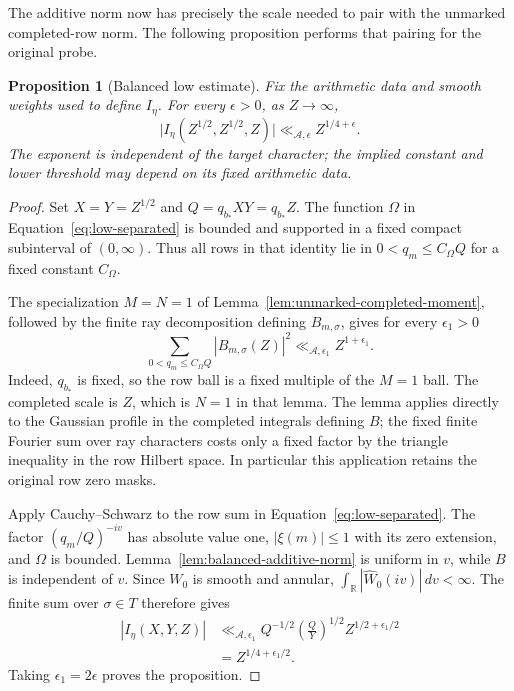 \documentclass[11pt,a4paper]{article}
\numberwithin{equation}{section}
\numberwithin{figure}{section}
\newtheorem{proposition}[theorem]{Proposition}
\theoremstyle{definition}
\theoremstyle{remark}
\begin{document}
The additive norm now has precisely the scale needed to pair with the
unmarked completed-row norm.  The following proposition performs that
pairing for the original probe.

\begin{proposition}[Balanced low estimate]
\label{prop:balanced-low}
Fix the arithmetic data and smooth weights used to define $I_\eta$.
For every $\epsilon>0$, as $Z\to\infty$,
\[
 \bigl|I_\eta(Z^{1/2},Z^{1/2},Z)\bigr|
 \ll_{\mathcal A,\epsilon} Z^{1/4+\epsilon}.
\]
The exponent is independent of the target character; the implied constant
and lower threshold may depend on its fixed arithmetic data.
\end{proposition}

\begin{proof}
Set $X=Y=Z^{1/2}$ and $Q=q_{b_*}XY=q_{b_*}Z$.  The function $\Omega$ in
Equation~\eqref{eq:low-separated} is bounded and supported in a fixed
compact subinterval of $(0,\infty)$.  Thus all rows in that identity lie
in $0<q_m\le C_\Omega Q$ for a fixed constant $C_\Omega$.

The specialization $M=N=1$ of
Lemma~\ref{lem:unmarked-completed-moment}, followed by the finite ray
decomposition defining $B_{m,\sigma}$, gives for every $\epsilon_1>0$
\[
 \sum_{0<q_m\le C_\Omega Q}|B_{m,\sigma}(Z)|^2
 \ll_{\mathcal A,\epsilon_1} Z^{1+\epsilon_1}.
\]
Indeed, $q_{b_*}$ is fixed, so the row ball is a fixed multiple of the
$M=1$ ball.  The completed scale is $Z$, which is $N=1$ in that lemma.
The lemma applies directly to the Gaussian profile in the
completed integrals defining $B$;
the fixed finite Fourier sum over ray characters costs only a fixed factor
by the triangle inequality in the row Hilbert space.  In particular this
application retains the original row zero masks.

Apply Cauchy--Schwarz to the row sum in
Equation~\eqref{eq:low-separated}.  The factor $(q_m/Q)^{-iv}$ has absolute
value one, $|\xi(m)|\le1$ with its zero extension, and $\Omega$ is bounded.
Lemma~\ref{lem:balanced-additive-norm} is uniform in $v$, while $B$ is
independent of $v$.  Since $W_0$ is smooth and annular,
$\int_{\mathbb R}|\widehat W_0(iv)|\,dv<\infty$.  The finite sum over
$\sigma\in T$ therefore gives
\[
 \begin{split}
 |I_\eta(X,Y,Z)|
 &\ll_{\mathcal A,\epsilon_1}
 Q^{-1/2}\left(\frac QY\right)^{1/2}Z^{1/2+\epsilon_1/2}\\
 &=Z^{1/4+\epsilon_1/2}.
 \end{split}
\]
Taking $\epsilon_1=2\epsilon$ proves the proposition.
\end{proof}
\end{document}
